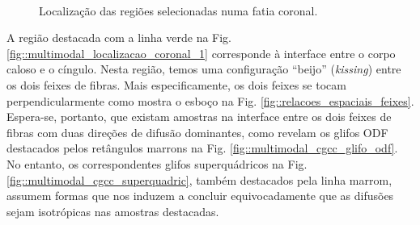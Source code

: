 \begin{figure}[H]
\centering
    \\
    \caption{Localização das regiões selecionadas numa fatia coronal.}
    \label{fig::multimodal_localizacao_1}
\end{figure}


A região destacada com a linha verde na Fig. \ref{fig::multimodal_localizacao_coronal_1} corresponde à interface entre o corpo caloso e o cíngulo. Nesta região, temos uma configuração ``beijo'' (\textit{kissing}) entre os dois feixes de fibras.  Mais especificamente, os dois feixes se tocam perpendicularmente como mostra o esboço na Fig. \ref{fig::relacoes_espaciais_feixes}. Espera-se, portanto, que existam amostras na interface entre os dois feixes de fibras com duas direções de difusão dominantes, como revelam os glifos ODF destacados pelos retângulos marrons na Fig. \ref{fig::multimodal_cgcc_glifo_odf}. No entanto, os correspondentes glifos superquádricos na Fig. \ref{fig::multimodal_cgcc_superquadric}, também destacados pela linha marrom, assumem formas que nos induzem a concluir equivocadamente que as difusões sejam isotrópicas nas amostras destacadas. 

